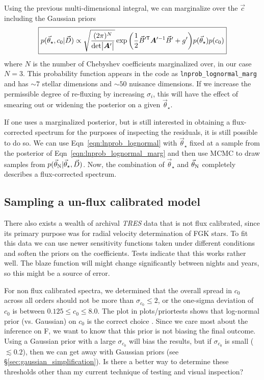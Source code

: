 \documentclass[preprint]{aastex} %
\newcommand{\vt}{\vec{\theta}}
\newcommand{\vstar}{\vt_{\star}}
\newcommand{\vN}{\vt_{\rm N}}
\newcommand{\vc}{\vec{c}}
\newcommand{\vD}{\vec{D}}
\newcommand{\trans}{\mathsf{T}}
\begin{document}
Using the previous multi-dimensional integral, we can marginalize over the $\vc$ including the Gaussian priors
\begin{equation}
  \boxed{
  p(\vstar, c_0 | \vD) \propto \sqrt{\frac{(2 \pi )^N}{ {\rm det} \bigl |{\bm A}^\prime \bigr |}} \exp{ \left ( \frac{1}{2} \vec{B}^{\prime\trans} {\bm A}^{\prime -1} \vec{B}^\prime + g^\prime \right )} p(\vstar) p(c_0)
}
\label{eqn:lnprob_lognormal_marg}
\end{equation}
where $N$ is the number of Chebyshev coefficients marginalized over, in our case $N=3$. This probability function appears in the code as \texttt{lnprob\_lognormal\_marg} and has $\sim 7$ stellar dimensions and $\sim 50$ nuisance dimensions. If we increase the permissible degree of re-fluxing by increasing $\sigma_i$, this will have the effect of smearing out or widening the posterior on a given $\vstar$.

If one uses a marginalized posterior, but is still interested in obtaining a flux-corrected spectrum for the purposes of inspecting the residuals, it is still possible to do so. We can use Eqn~\ref{eqn:lnprob_lognormal} with $\vstar$ fixed at a sample from the posterior of Eqn~\ref{eqn:lnprob_lognormal_marg} and then use MCMC to draw samples from $p(\vN | \vstar, \vD)$. Now, the combination of $\vstar$ and $\vN$ completely describes a flux-corrected spectrum.

\subsection{Sampling a un-flux calibrated model}
There also exists a wealth of archival \emph{TRES} data that is not flux calibrated, since its primary purpose was for radial velocity determination of FGK stars. To fit this data we can use newer sensitivity functions taken under different conditions and soften the priors on the coefficients. Tests indicate that this works rather well. The blaze function will might change significantly between nights and years, so this might be a source of error.

For non flux calibrated spectra, we determined that the overall spread in $c_0$ across all orders should not be more than $\sigma_{c_0} \leq 2$, or the one-sigma deviation of $c_0$ is between $0.125 \leq c_0 \leq 8.0$. The plot in plots/priortests shows that log-normal prior (vs. Gaussian) on $c_0$ is the correct choice . Since we care most about the inference on F, we want to know that this prior is not biasing the final outcome. Using a Gaussian prior with a large $\sigma_{c_0}$ will bias the results, but if $\sigma_{c_0}$ is small ($\lesssim 0.2$), then we can get away with Gaussian priors (see \S\ref{sec:gaussian_simplification}). Is there a better way to determine these thresholds other than my current technique of testing and visual inspection?
 
\end{document}
